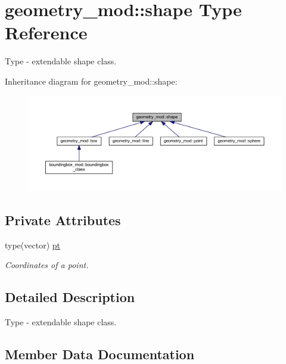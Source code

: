 \hypertarget{structgeometry__mod_1_1shape}{}\section{geometry\+\_\+mod\+:\+:shape Type Reference}
\label{structgeometry__mod_1_1shape}


Type -\/ extendable shape class.  




Inheritance diagram for geometry\+\_\+mod\+:\+:shape\+:
\nopagebreak
\begin{figure}[H]
\begin{center}
\leavevmode
\includegraphics[width=350pt]{structgeometry__mod_1_1shape__inherit__graph}
\end{center}
\end{figure}
\subsection*{Private Attributes}
\begin{DoxyCompactItemize}
\item 
type(vector) \hyperlink{structgeometry__mod_1_1shape_a4c7824c0af103efbef53cbcacb9a5de0}{pt}
\begin{DoxyCompactList}\small\item\em Coordinates of a point. \end{DoxyCompactList}\end{DoxyCompactItemize}


\subsection{Detailed Description}
Type -\/ extendable shape class. 

\subsection{Member Data Documentation}
\mbox{\label{structgeometry__mod_1_1shape_a4c7824c0af103efbef53cbcacb9a5de0}} 
